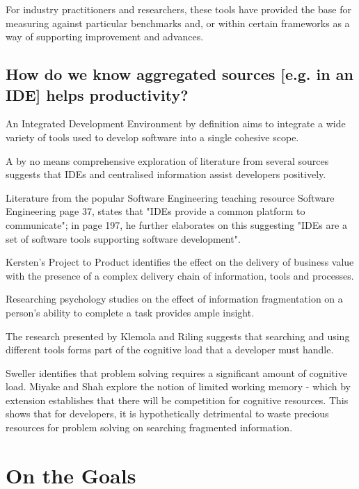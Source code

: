 For industry practitioners and researchers, these tools have provided the base for measuring against particular benchmarks and, or within certain frameworks as a way of supporting improvement and advances.


\subsection{How do we know aggregated sources [e.g. in an IDE] helps productivity?}

An Integrated Development Environment by definition aims to integrate a wide variety of tools used to develop software into a single cohesive scope. 

A by no means comprehensive exploration of literature from several sources suggests that IDEs and centralised information assist developers positively. 

Literature from the popular Software Engineering teaching resource Software Engineering \parencite{Sommerville:2010:SE:1841764} page 37, states that "IDEs provide a common platform to communicate"; in page 197, he further elaborates on this suggesting "IDEs are a set of software tools supporting software development".

Kersten's Project to Product \parencite*{kersten2018projecproduct} identifies the effect on the delivery of business value with the presence of a complex delivery chain of information, tools and processes.

Researching psychology studies on the effect of information fragmentation on a person's ability to complete a task provides ample insight. 

The research presented by Klemola and Riling \parencite*{klemola2002modeling} suggests that searching and using different tools forms part of the cognitive load that a developer must handle.

Sweller \parencite*{sweller1998cognitive} identifies that problem solving requires a significant amount of cognitive load. Miyake and Shah \parencite*{miyake1999models} explore the notion of limited working memory - which by extension establishes that there will be competition for cognitive resources. This shows that for developers, it is hypothetically detrimental to waste precious resources for problem solving on searching fragmented information.


\section{On the Goals}


